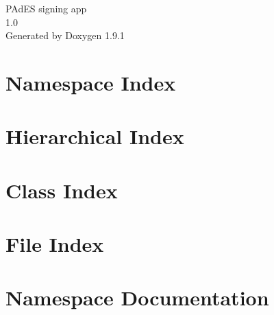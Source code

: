 \let\mypdfximage\pdfximage\def\pdfximage{\immediate\mypdfximage}\documentclass[twoside]{book}
\newcommand{\+}{\discretionary{\mbox{\scriptsize$\hookleftarrow$}}{}{}}
\newcommand{\clearemptydoublepage}{%
  \newpage{\pagestyle{empty}\cleardoublepage}%
}
\begin{document}
\raggedbottom

\hypersetup{pageanchor=false,
             bookmarksnumbered=true,
             pdfencoding=unicode
            }
\begin{titlepage}
\vspace*{7cm}
\begin{center}%
{\Large PAd\+ES signing app \\[1ex]\large 1.\+0 }\\
\vspace*{1cm}
{\large Generated by Doxygen 1.9.1}\\
\end{center}
\end{titlepage}
\clearemptydoublepage
{}
\tableofcontents
\clearemptydoublepage
{}
\hypersetup{pageanchor=true}

\chapter{Namespace Index}

\chapter{Hierarchical Index}

\chapter{Class Index}

\chapter{File Index}

\chapter{Namespace Documentation}


















\end{document}
